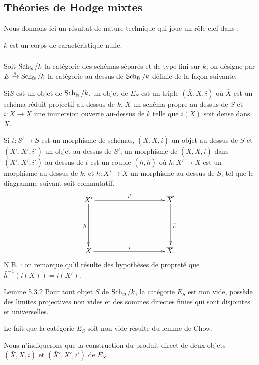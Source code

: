 \documentclass[10pt]{../fichiers-configuration-latex/smfart}
\begin{document}
\subsection{Théories de Hodge mixtes}

Nous donnons ici un résultat de nature technique qui joue un rôle clef
dans \cite{SGA4-05bis:2}.

$k$ est un corps de caractéristique nulle.

\subsubsection{}
Soit $\operatorname{Sch}_{\operatorname{fs}} /k$ la catégorie des schémas séparés et de type fini
sur $k$; on désigne par $E \xrightarrow{\pi} \operatorname{Sch}_{\operatorname{fs}}/k$ la catégorie
au-dessus de $\operatorname{Sch}_{\operatorname{fs}}/k$ définie de la façon suivante:

\noindent \sisi{$+$}{} Si\pageoriginale $S$ est un objet de $\operatorname{Sch}_{\operatorname{fs}} /k$,
un objet de $E_S$ est un triple $(\bar{X}, X, i)$ où $\bar{X}$ est un schéma
réduit projectif au-dessus de $k$, $X$ un schéma propre au-dessus de $S$ et
$i : X \to \bar{X}$ une immersion ouverte au-dessus de $k$ telle que $i(X)$
soit dense dans $\bar{X}$.

\noindent \sisi{$+$}{} Si $t : S' \to S$ est un morphisme de schémas,
$(\bar{X}, X, i)$ un objet au-dessus de $S$ et $(\bar{X}', X', i')$ un objet
au-dessus de $S'$, un morphisme de $(\bar{X}, X, i)$ dans $(\bar{X}', X',
i')$ au-dessus de $t$ est un couple $(\bar{h}, h)$ où $h : \bar{X}'\to
\bar{X}$ est un morphisme au-dessus de $k$, et $h : X'\to X$ un morphisme
au-dessus de $S$, tel que le diagramme suivant soit commutatif.
\[
\xymatrix@C=3.5cm@R=2cm{
X' \ar[r]^{i'} \ar[d]_{h}& \bar{X}'\ar[d]^{\bar{h}}\\
X  \ar[r]^{i}& \bar{X}.
}
\]
N.B. : on remarque qu'il résulte des hypothèses de propreté que
$\bar{h}^{-1}(i(X)) = i(X')$.

\begin{enonce*}{Lemme 5.3.2}
Pour tout objet $S$ de $\operatorname{Sch}_{\operatorname{fs}} / k$, la catégorie $E_S$ est non
vide, possède des limites projectives non vides et des sommes directes
finies qui sont disjointes et universelles.
\end{enonce*}

Le fait que la catégorie $E_S$ soit non vide résulte du lemme de Chow.

Nous n'indiquerons que la construction du produit direct de deux
objets $(\bar{X}, X, i)$ et $(\bar{X}', X', i')$ de $E_S$.
\end{document}

